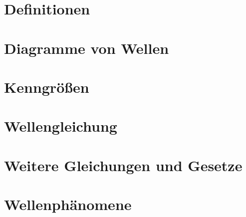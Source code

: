 \section{Definitionen} \label{sec:definition_wellen}


\section{Diagramme von Wellen} \label{sec:diagramm_wellen}


\section{Kenngrößen} \label{sec:kenngroessen_wellen}


\section{Wellengleichung} \label{sec:wellengleichung}


\section{Weitere Gleichungen und Gesetze} \label{sec:gesetze}


\section{Wellenphänomene} \label{sec:phaenomene_wellen}


